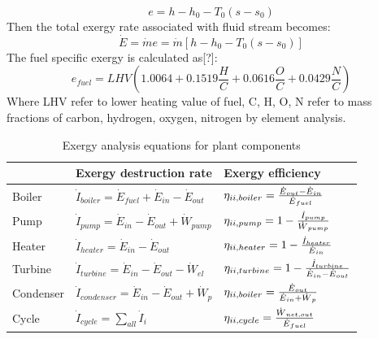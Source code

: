 \documentclass[preprint,12pt]{elsarticle}
\begin{document}
\begin{equation}{}
\label{equation:3}
e=h-h_{0}-T_{0}\left(s-s_{0}\right)
\end{equation}
Then the total exergy rate associated with ﬂuid stream becomes:
\begin{equation}
\dot{E}=\dot{m}e=\dot{m}\left[h-h_{0}-T_{0}\left(s-s_{0}\right)\right]{}
\end{equation}
The fuel speciﬁc exergy is calculated as[?]: 
\begin{equation}
e_{fuel}=LHV\left(1.0064+0.1519\frac{H}{C}+0.0616\frac{O}{C}+0.0429\frac{N}{C}\right)
\end{equation}
Where LHV refer to lower heating value of fuel, C, H, O, N refer to mass fractions of carbon, hydrogen, oxygen, nitrogen by element analysis.
\begin{table}
\caption{Exergy analysis equations for plant components}
\label{tab:exergy equation}
\centering
\begin{tabular}{lll}
\toprule 
 & Exergy destruction rate  & Exergy efficiency\tabularnewline
\midrule
Boiler & $\dot{I}_{boiler}=\dot{E}{}_{fuel}+\dot{E}{}_{in}-\dot{E}{}_{out}$ & $\eta_{\uppercase\expandafter{\romannumeral2},boiler}=\frac{\dot{E}{}_{out}-\dot{E}{}_{in}}{\dot{E}{}_{fuel}}$\tabularnewline
Pump & $\dot{I}_{pump}=\dot{E}{}_{in}-\dot{E}{}_{out}+\dot{W}{}_{pump}$ & $\eta_{\uppercase\expandafter{\romannumeral2},pump}=1-\frac{\dot{I}_{pump}}{\dot{W}{}_{pump}}$\tabularnewline
Heater & $\dot{I}_{heater}=\dot{E}{}_{in}-\dot{E}{}_{out}$ & $\eta_{\uppercase\expandafter{\romannumeral2},heater}=1-\frac{\dot{I}_{heater}}{\dot{E}{}_{in}}$\tabularnewline
Turbine & $\dot{I}_{turbine}=\dot{E}{}_{in}-\dot{E}{}_{out}-\dot{W}{}_{el}$ & $\eta_{\uppercase\expandafter{\romannumeral2},turbine}=1-\frac{\dot{I}_{turbine}}{\dot{E}{}_{in}-\dot{E}{}_{out}}$\tabularnewline
Condenser & $\dot{I}_{condenser}=\dot{E}{}_{in}-\dot{E}{}_{out}+\dot{W}{}_{p}$ & $\eta_{\uppercase\expandafter{\romannumeral2},boiler}=\frac{\dot{E}{}_{out}}{\dot{E}{}_{in}+\dot{W}{}_{p}}$\tabularnewline
Cycle & $\dot{I}_{cycle}=\sum_{all}\dot{I}_{i}$ & $\eta_{\uppercase\expandafter{\romannumeral2},cycle}=\frac{\dot{W}{}_{net,out}}{\dot{E}{}_{fuel}}$\tabularnewline
\bottomrule
\end{tabular}
\end{table}
\end{document}
